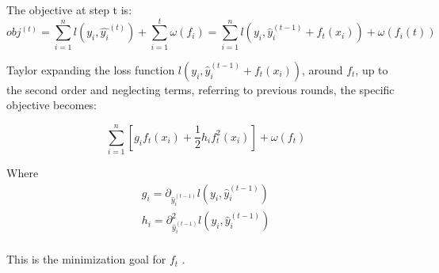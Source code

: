 \begin{itemize}
The objective at step t is:
\begin{equation}
obj^{(t)} = \sum_{i=1}^{n} l(y_{i}, \hat{y_{i}}^{(t)}) + \sum_{i=1}^{t}\omega(f_{i}) = \sum _{i=1}^{n} l(y_{i}, \hat{y}_{i}^{(t-1)} + f_{t}(x_{i})) + \omega(f_{i}(t))
\end{equation}

Taylor expanding the loss function \(l(y_{i}, \hat{y}_{i}^{(t-1)} + f_{t}(x_{i}))\), around \(f_{t}\), up to the second order and neglecting terms, referring to previous rounds, the specific objective becomes:

\begin{equation}
\sum_{i=1}^{n}\left [ g_{i}f_{t}(x_{i})+\frac{1}{2}h_{i}f^{2}_{t} (x_{i}) \right ] + \omega(f_{t})
\end{equation}

Where
\begin{equation}
\begin{matrix}
g_{i} = \partial_{\hat{y}_{i}^{(t-1) }} l(y_{i}, \hat{y}_{i}^{(t-1)} ) \\
h_{i} = \partial^{2}_{\hat{y}_{i}^{(t-1) }} l(y_{i}, \hat{y}_{i}^{(t-1)} ) \\
\end{matrix}
\end{equation}

This is the minimization goal for \(f_{t}\) . \cite{xgboost}
\end{itemize}

